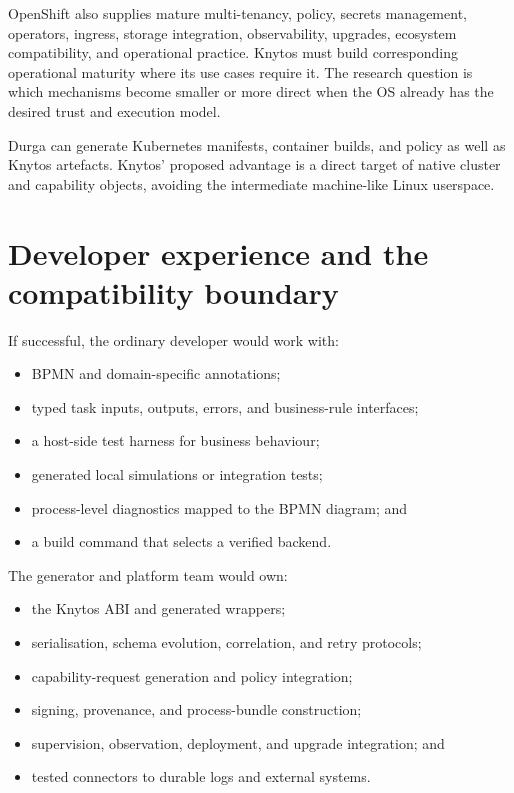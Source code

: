OpenShift also supplies mature multi-tenancy, policy, secrets management,
operators, ingress, storage integration, observability, upgrades, ecosystem
compatibility, and operational practice. Knytos must build corresponding
operational maturity where its use cases require it. The research question is
which mechanisms become smaller or more direct when the OS already has the
desired trust and execution model.

Durga can generate Kubernetes manifests, container builds, and policy as well as
Knytos artefacts. Knytos' proposed advantage is a direct target of native cluster
and capability objects, avoiding the intermediate machine-like Linux userspace.

\section{Developer experience and the compatibility boundary}

If successful, the ordinary developer would work with:

\begin{itemize}
    \item BPMN and domain-specific annotations;
    \item typed task inputs, outputs, errors, and business-rule interfaces;
    \item a host-side test harness for business behaviour;
    \item generated local simulations or integration tests;
    \item process-level diagnostics mapped to the BPMN diagram; and
    \item a build command that selects a verified backend.
\end{itemize}

The generator and platform team would own:

\begin{itemize}
    \item the Knytos ABI and generated wrappers;
    \item serialisation, schema evolution, correlation, and retry protocols;
    \item capability-request generation and policy integration;
    \item signing, provenance, and process-bundle construction;
    \item supervision, observation, deployment, and upgrade integration; and
    \item tested connectors to durable logs and external systems.
\end{itemize}

